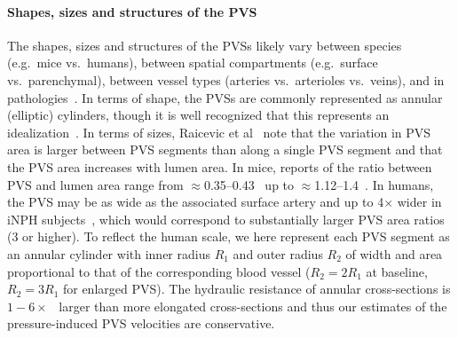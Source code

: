 \documentclass[fleqn,10pt]{wlscirep}
\begin{document}
\paragraph{Shapes, sizes and structures of the PVS}
The shapes, sizes and structures of the PVSs likely vary between
species (e.g.~mice vs.~humans), between spatial compartments
(e.g.~surface vs.~parenchymal), between vessel types (arteries
vs.~arterioles vs.~veins), and in
pathologies~\cite{ichimura1991distribution, foley2012realtime,
  schain2017cortical, mestre2018flow, bedussi2018paravascular,
  mestre2022periarteriolar, smets2024perivascular, raicevic2023sizes,
  vinje2021brain, eide2024functional}. In terms of shape, the PVSs are
commonly represented as annular (elliptic) cylinders, though it is
well recognized that this represents an
idealization~\cite{mestre2018flow, tithof2019hydraulic,
  vinje2021brain, raicevic2023sizes, boster2024hydraulic,
  smets2024perivascular}. In terms of sizes, Raicevic et
al~\cite{raicevic2023sizes} note that the variation in PVS area is
larger between PVS segments than along a single PVS segment and that
the PVS area increases with lumen area. In mice, reports of the ratio
between PVS and lumen area range from
$\approx$0.35--0.43~\cite{smets2024perivascular} up to
$\approx$1.12--1.4~\cite{raicevic2023sizes, mestre2018flow}. In
humans, the PVS may be as wide as the associated surface artery and up
to 4$\times$ wider in iNPH subjects~\cite{eide2024functional}, which
would correspond to substantially larger PVS area ratios (3 or
higher). To reflect the human scale, we here represent each PVS
segment as an annular cylinder with inner radius $R_1$ and outer
radius $R_2$ of width and area proportional to that of the
corresponding blood vessel ($R_2 = 2 R_1$ at baseline, $R_2 = 3 R_1$
for enlarged PVS). The hydraulic resistance of annular cross-sections
is $1-6 \times$~\cite{tithof2019hydraulic} larger than more elongated
cross-sections and thus our estimates of the pressure-induced PVS
velocities are conservative.



\renewcommand{\refname}{Supplementary References} %

\end{document}
